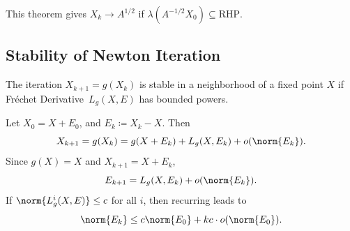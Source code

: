 \documentclass{article}
\def\FD{Fr\'echet Derivative}
\begin{document}
This theorem gives $X_k \to A^{1/2}$ if $\lambda(A^{-1/2}X_0) \subseteq
\text{RHP}$. 

\subsection{Stability of Newton Iteration}

\begin{definition} \label{def.stability}
    The iteration $X_{k+1} = g(X_k)$ is stable in a neighborhood of a
    fixed point $X$ if \FD\ $L_{g}(X,E)$ has bounded powers.
\end{definition}

Let $X_0 = X + E_0$, and $E_k \coloneqq X_k - X$. Then 
\begin{equation}\notag
    X_{k+1} = g(X_k) = g(X+E_k) + L_{g}(X,E_k) + o(\norm{E_k}).
\end{equation}
Since $g(X) = X$ and $X_{k+1} = X + E_k$, 
\begin{equation}\notag
    E_{k+1} = L_{g}(X,E_k) + o(\norm{E_k}).
\end{equation}
If $\norm{L_{g}^i(X,E)}\leq c$ for all $i$, then recurring leads to 
\begin{equation}\notag
    \norm{E_k} \leq c\norm{E_0} + kc\cdot o(\norm{E_0}).
\end{equation}
\end{document}

